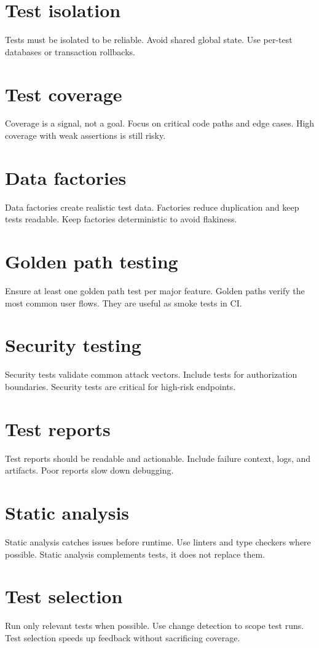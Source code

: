 \section{Test isolation}
Tests must be isolated to be reliable.
Avoid shared global state.
Use per-test databases or transaction rollbacks.

\section{Test coverage}
Coverage is a signal, not a goal.
Focus on critical code paths and edge cases.
High coverage with weak assertions is still risky.

\section{Data factories}
Data factories create realistic test data.
Factories reduce duplication and keep tests readable.
Keep factories deterministic to avoid flakiness.

\section{Golden path testing}
Ensure at least one golden path test per major feature.
Golden paths verify the most common user flows.
They are useful as smoke tests in CI.

\section{Security testing}
Security tests validate common attack vectors.
Include tests for authorization boundaries.
Security tests are critical for high-risk endpoints.

\section{Test reports}
Test reports should be readable and actionable.
Include failure context, logs, and artifacts.
Poor reports slow down debugging.

\section{Static analysis}
Static analysis catches issues before runtime.
Use linters and type checkers where possible.
Static analysis complements tests, it does not replace them.

\section{Test selection}
Run only relevant tests when possible.
Use change detection to scope test runs.
Test selection speeds up feedback without sacrificing coverage.

